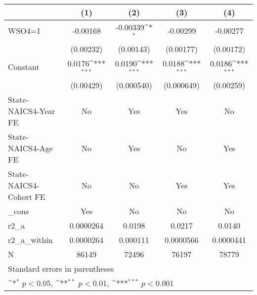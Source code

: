 {
\def\sym#1{\ifmmode^{#1}\else\(^{#1}\)\fi}
\begin{tabular}{l*{4}{c}}
\hline\hline
                    &\multicolumn{1}{c}{(1)}         &\multicolumn{1}{c}{(2)}         &\multicolumn{1}{c}{(3)}         &\multicolumn{1}{c}{(4)}         \\
\hline
WSO4=1              &    -0.00168         &    -0.00339\sym{*}  &    -0.00299         &    -0.00277         \\
                    &   (0.00232)         &   (0.00143)         &   (0.00177)         &   (0.00172)         \\
[1em]
Constant            &      0.0176\sym{***}&      0.0190\sym{***}&      0.0188\sym{***}&      0.0186\sym{***}\\
                    &   (0.00429)         &  (0.000540)         &  (0.000649)         &   (0.00259)         \\
[1em]
State-NAICS4-Year FE&          No         &         Yes         &         Yes         &          No         \\
[1em]
State-NAICS4-Age FE &          No         &         Yes         &          No         &         Yes         \\
[1em]
State-NAICS4-Cohort FE&          No         &          No         &         Yes         &         Yes         \\
[1em]
\_cons              &         Yes         &          No         &          No         &          No         \\
\hline
r2\_a                &   0.0000264         &      0.0198         &      0.0217         &      0.0140         \\
r2\_a\_within         &   0.0000264         &    0.000111         &   0.0000566         &   0.0000441         \\
N                   &       86149         &       72496         &       76197         &       78779         \\
\hline\hline
\multicolumn{5}{l}{\footnotesize Standard errors in parentheses}\\
\multicolumn{5}{l}{\footnotesize \sym{*} \(p<0.05\), \sym{**} \(p<0.01\), \sym{***} \(p<0.001\)}\\
\end{tabular}
}
